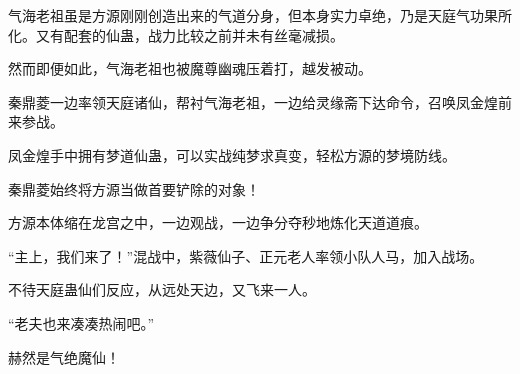 \begin{this_body}
气海老祖虽是方源刚刚创造出来的气道分身，但本身实力卓绝，乃是天庭气功果所化。又有配套的仙蛊，战力比较之前并未有丝毫减损。

然而即便如此，气海老祖也被魔尊幽魂压着打，越发被动。

秦鼎菱一边率领天庭诸仙，帮衬气海老祖，一边给灵缘斋下达命令，召唤凤金煌前来参战。

凤金煌手中拥有梦道仙蛊，可以实战纯梦求真变，轻松方源的梦境防线。

秦鼎菱始终将方源当做首要铲除的对象！

方源本体缩在龙宫之中，一边观战，一边争分夺秒地炼化天道道痕。

“主上，我们来了！”混战中，紫薇仙子、正元老人率领小队人马，加入战场。

不待天庭蛊仙们反应，从远处天边，又飞来一人。

“老夫也来凑凑热闹吧。”

赫然是气绝魔仙！

\end{this_body}

